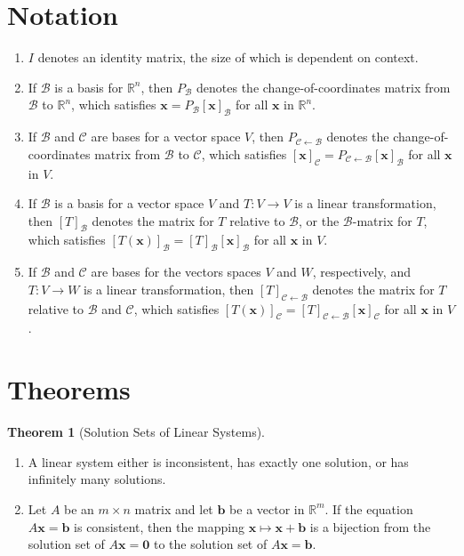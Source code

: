 \documentclass{myart}
\renewcommand{\vec}[1]{\ensuremath{\mathbf{#1}}} %
\newcommand{\mat}[1]{\ensuremath{#1}} %
\newcommand{\R}[1][]{\ensuremath{\mathbb{R}^{#1}}} %
\newcommand{\by}{\ensuremath{\times}} %
\newcommand{\basis}[1]{\ensuremath{\mathcal{#1}}} %
\newcommand{\from}{\leftarrow} %
\newcommand{\coord}[2]{\ensuremath{\left[#1\right]_{#2}}} %
\newcommand{\chcoordr}[1]{\ensuremath{P_{#1}}} %
\newcommand{\chcoord}[2]{\ensuremath{P_{#1 \from #2}}} %
\newcommand{\transmat}[2]{\coord{#1}{#2}} %
\newcommand{\transmatb}[3]{\coord{#1}{#2 \from #3}} %
\theoremstyle{definition}
\newtheorem{thm}{Theorem}
\begin{document}

\section{Notation}

\begin{enumerate}
\item $I$ denotes an identity matrix, the size of which is dependent on context.
\item If \basis B is a basis for \R[n], then \chcoordr{\basis B} denotes the change-of-coordinates matrix from \basis B to \R[n], which satisfies $\vec x = \chcoordr{\basis B}\coord{\vec x}{\basis B}$ for all \vec x in \R[n].
\item If \basis B and \basis C are bases for a vector space $V$, then \chcoord{\basis C}{\basis B} denotes the change-of-coordinates matrix from \basis B to \basis C, which satisfies $\coord{\vec x}{\basis C} = \chcoord{\basis C}{\basis B}\coord{\vec x}{\basis B}$ for all \vec x in $V$.
\item If \basis B is a basis for a vector space $V$ and $T: V \to V$ is a linear transformation, then  \transmat{T}{\basis B} denotes the matrix for $T$ relative to \basis B, or the \basis B-matrix for $T$, which satisfies $\coord{T(\vec x)}{\basis B} = \transmat{T}{\basis B}\coord{\vec x}{\basis B}$ for all \vec x in $V$.
\item If \basis B and \basis C are bases for the vectors spaces $V$ and $W$, respectively, and $T: V \to W$ is a linear transformation, then \transmatb{T}{\basis C}{\basis B} denotes the matrix for $T$ relative to \basis B and \basis C, which satisfies $\coord{T(\vec x)}{\basis C} = \transmatb{T}{\basis C}{\basis B}\coord{\vec x}{\basis C}$ for all \vec x in $V$.
\end{enumerate}

\section{Theorems}

\begin{thm}[Solution Sets of Linear Systems] \hfill
\begin{enumerate}
\item A linear system either is inconsistent, has exactly one solution, or has infinitely many solutions.
\item Let \mat A be an $m \by n$ matrix and let \vec b be a vector in \R[m]. If the equation $\mat A\vec x = \vec b$ is consistent, then the mapping $\vec x \mapsto \vec x + \vec b$ is a bijection from the solution set of $\mat A\vec x = \vec 0$ to the solution set of $\mat A\vec x = \vec b$.
\end{enumerate}
\end{thm}
\end{document}
